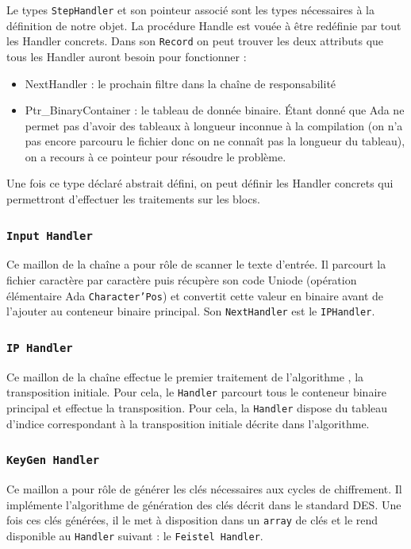 \documentclass[a4paper]{article}
\begin{document}
Le types \texttt{StepHandler} et son pointeur associé sont les types nécessaires à la définition de notre objet. La procédure Handle est vouée à être redéfinie par tout les Handler concrets.
\smallbreak
Dans son \texttt{Record} on peut trouver les deux attributs que tous les Handler auront besoin pour fonctionner : 
\begin{itemize}
\item NextHandler : le prochain filtre dans la chaîne de responsabilité
\item Ptr\_BinaryContainer : le tableau de donnée binaire. Étant donné que Ada ne permet pas d'avoir des tableaux à longueur inconnue à la compilation (on n'a pas encore parcouru le fichier donc on ne connaît pas la longueur du tableau), on a recours à ce pointeur pour résoudre le problème.
\end{itemize}
Une fois ce type déclaré abstrait défini, on peut définir les Handler concrets qui permettront d'effectuer les traitements sur les blocs.


\subsubsection{\texttt{Input Handler}}
Ce maillon de la chaîne a pour rôle de scanner le texte d'entrée. Il parcourt la fichier caractère par caractère puis récupère son code Uniode (opération élémentaire Ada \texttt{Character'Pos}) et convertit cette valeur en binaire avant de l'ajouter au conteneur binaire principal. Son \texttt{NextHandler} est le \texttt{IPHandler}.

\subsubsection{\texttt{IP Handler}}
Ce maillon de la chaîne effectue le premier traitement de l'algorithme , la transposition initiale. Pour cela, le \texttt{Handler} parcourt tous le conteneur binaire principal et effectue la transposition. Pour cela, la \texttt{Handler} dispose du tableau d'indice correspondant à la transposition initiale décrite dans l'algorithme.

\subsubsection{\texttt{KeyGen Handler}}
Ce maillon a pour rôle de générer les clés nécessaires aux cycles de chiffrement. Il implémente l'algorithme de génération des clés décrit dans le standard DES. Une fois ces clés générées, il le met à disposition dans un \texttt{array} de clés et le rend disponible au \texttt{Handler} suivant : le \texttt{Feistel Handler}.
\end{document}
